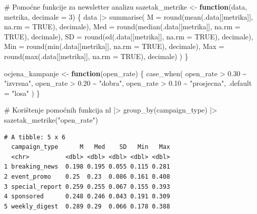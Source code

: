 \documentclass[
  croatian,
  letterpaper,
  DIV=11,
  numbers=noendperiod]{scrartcl}
\newenvironment{Shaded}{\begin{snugshade}}{\end{snugshade}}
\newcommand{\AttributeTok}[1]{\textcolor[rgb]{0.40,0.45,0.13}{#1}}
\newcommand{\CommentTok}[1]{\textcolor[rgb]{0.37,0.37,0.37}{#1}}
\newcommand{\ConstantTok}[1]{\textcolor[rgb]{0.56,0.35,0.01}{#1}}
\newcommand{\ControlFlowTok}[1]{\textcolor[rgb]{0.00,0.23,0.31}{\textbf{#1}}}
\newcommand{\DecValTok}[1]{\textcolor[rgb]{0.68,0.00,0.00}{#1}}
\newcommand{\FloatTok}[1]{\textcolor[rgb]{0.68,0.00,0.00}{#1}}
\newcommand{\FunctionTok}[1]{\textcolor[rgb]{0.28,0.35,0.67}{#1}}
\newcommand{\NormalTok}[1]{\textcolor[rgb]{0.00,0.23,0.31}{#1}}
\newcommand{\OtherTok}[1]{\textcolor[rgb]{0.00,0.23,0.31}{#1}}
\newcommand{\SpecialCharTok}[1]{\textcolor[rgb]{0.37,0.37,0.37}{#1}}
\newcommand{\StringTok}[1]{\textcolor[rgb]{0.13,0.47,0.30}{#1}}
\begin{document}
\begin{Shaded}
\begin{Highlighting}[]
\CommentTok{\# Pomoćne funkcije za newsletter analizu}
\NormalTok{sazetak\_metrike }\OtherTok{\textless{}{-}} \ControlFlowTok{function}\NormalTok{(data, metrika, }\AttributeTok{decimale =} \DecValTok{3}\NormalTok{) \{}
\NormalTok{  data }\SpecialCharTok{|\textgreater{}}
    \FunctionTok{summarise}\NormalTok{(}
      \AttributeTok{M =} \FunctionTok{round}\NormalTok{(}\FunctionTok{mean}\NormalTok{(.data[[metrika]], }\AttributeTok{na.rm =} \ConstantTok{TRUE}\NormalTok{), decimale),}
      \AttributeTok{Med =} \FunctionTok{round}\NormalTok{(}\FunctionTok{median}\NormalTok{(.data[[metrika]], }\AttributeTok{na.rm =} \ConstantTok{TRUE}\NormalTok{), decimale),}
      \AttributeTok{SD =} \FunctionTok{round}\NormalTok{(}\FunctionTok{sd}\NormalTok{(.data[[metrika]], }\AttributeTok{na.rm =} \ConstantTok{TRUE}\NormalTok{), decimale),}
      \AttributeTok{Min =} \FunctionTok{round}\NormalTok{(}\FunctionTok{min}\NormalTok{(.data[[metrika]], }\AttributeTok{na.rm =} \ConstantTok{TRUE}\NormalTok{), decimale),}
      \AttributeTok{Max =} \FunctionTok{round}\NormalTok{(}\FunctionTok{max}\NormalTok{(.data[[metrika]], }\AttributeTok{na.rm =} \ConstantTok{TRUE}\NormalTok{), decimale)}
\NormalTok{    )}
\NormalTok{\}}

\NormalTok{ocjena\_kampanje }\OtherTok{\textless{}{-}} \ControlFlowTok{function}\NormalTok{(open\_rate) \{}
  \FunctionTok{case\_when}\NormalTok{(}
\NormalTok{    open\_rate }\SpecialCharTok{\textgreater{}} \FloatTok{0.30} \SpecialCharTok{\textasciitilde{}} \StringTok{"izvrsna"}\NormalTok{,}
\NormalTok{    open\_rate }\SpecialCharTok{\textgreater{}} \FloatTok{0.20} \SpecialCharTok{\textasciitilde{}} \StringTok{"dobra"}\NormalTok{,}
\NormalTok{    open\_rate }\SpecialCharTok{\textgreater{}} \FloatTok{0.10} \SpecialCharTok{\textasciitilde{}} \StringTok{"prosjecna"}\NormalTok{,}
    \AttributeTok{.default =} \StringTok{"losa"}
\NormalTok{  )}
\NormalTok{\}}

\CommentTok{\# Korištenje pomoćnih funkcija}
\NormalTok{nl }\SpecialCharTok{|\textgreater{}}
  \FunctionTok{group\_by}\NormalTok{(campaign\_type) }\SpecialCharTok{|\textgreater{}}
  \FunctionTok{sazetak\_metrike}\NormalTok{(}\StringTok{"open\_rate"}\NormalTok{)}
\end{Highlighting}
\end{Shaded}

\begin{verbatim}
# A tibble: 5 x 6
  campaign_type      M   Med    SD   Min   Max
  <chr>          <dbl> <dbl> <dbl> <dbl> <dbl>
1 breaking_news  0.198 0.195 0.055 0.115 0.281
2 event_promo    0.25  0.23  0.086 0.161 0.408
3 special_report 0.259 0.255 0.067 0.155 0.393
4 sponsored      0.248 0.246 0.043 0.191 0.309
5 weekly_digest  0.289 0.29  0.066 0.178 0.388
\end{verbatim}
\end{document}
